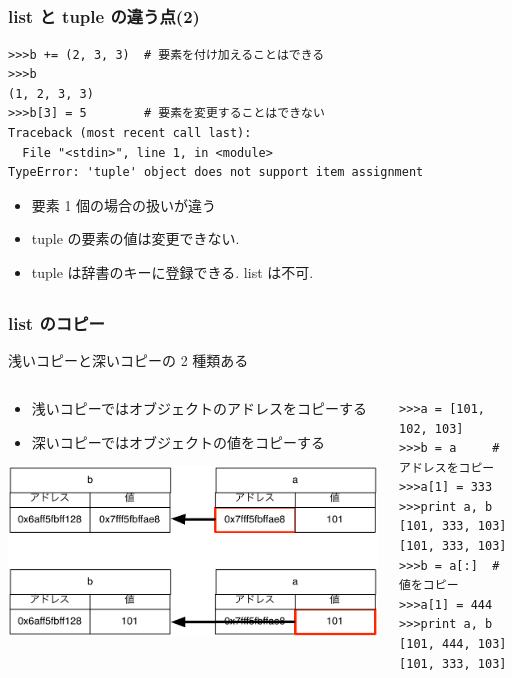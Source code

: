 \subsection*{\redm\whitem\greenb}
\begin{frame}[t,fragile]
\frametitle{list と tuple の違う点(2)}
\begin{lstlisting}
>>>b += (2, 3, 3)  # 要素を付け加えることはできる
>>>b
(1, 2, 3, 3)
>>>b[3] = 5        # 要素を変更することはできない
Traceback (most recent call last):
  File "<stdin>", line 1, in <module>
TypeError: 'tuple' object does not support item assignment
\end{lstlisting}
\begin{itemize}
\item 要素 1 個の場合の扱いが違う
\item tuple の要素の値は変更できない. 
\item tuple は辞書のキーに登録できる. list は不可. 
\end{itemize}
\end{frame}

\subsection*{\redm\whitem\greenb}
\begin{frame}[t,fragile]
\frametitle{list のコピー}
浅いコピーと深いコピーの 2 種類ある
\begin{columns}
\begin{column}{5cm}
\begin{itemize}
\item 浅いコピーではオブジェクトのアドレスをコピーする
\item 深いコピーではオブジェクトの値をコピーする
\end{itemize}
\includegraphics[width = \textwidth]{copy.pdf}
\end{column}

\begin{column}{7cm}
\begin{lstlisting}
>>>a = [101, 102, 103]                 
>>>b = a     # アドレスをコピー
>>>a[1] = 333
>>>print a, b 
[101, 333, 103] [101, 333, 103]
>>>b = a[:]  # 値をコピー
>>>a[1] = 444
>>>print a, b
[101, 444, 103] [101, 333, 103]
\end{lstlisting}
\end{column}
\end{columns}
\end{frame}

